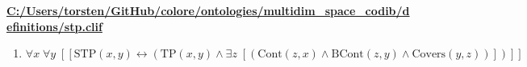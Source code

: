 \documentclass{article}
\begin{document}
\textbf{\url{C:/Users/torsten/GitHub/colore/ontologies/multidim\_space\_codib/definitions/stp.clif}}

\begin{enumerate}
\item $\forall x\; \forall y\;  \left[ \left[ \textrm{STP}(x,y) \leftrightarrow \left(\textrm{TP}(x,y) \land \exists z\;  \left[ \left(\textrm{Cont}(z,x) \land \textrm{BCont}(z,y) \land \textrm{Covers}(y,z)\right) \right]\right) \right] \right]$
\end{enumerate}
\end{document}
